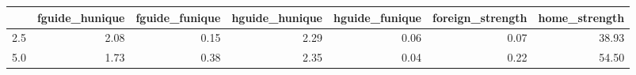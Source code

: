 \begin{tabular}{lrrrrrr}
\toprule
 & fguide_hunique & fguide_funique & hguide_hunique & hguide_funique & foreign_strength & home_strength \\
\midrule
2.5 & 2.08 & 0.15 & 2.29 & 0.06 & 0.07 & 38.93 \\
5.0 & 1.73 & 0.38 & 2.35 & 0.04 & 0.22 & 54.50 \\
\bottomrule
\end{tabular}
